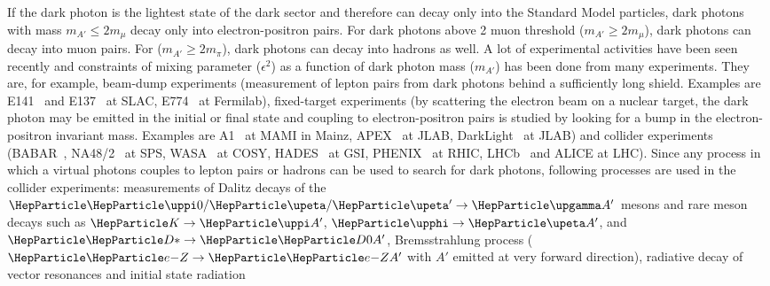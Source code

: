 \documentclass[../report.tex]{subfiles}
\begin{document}


If the dark photon is the lightest state of the dark sector 
and therefore can decay only into the Standard Model particles, dark photons with mass $m_{A'} \le 2m_{\mu}$ decay only into electron-positron pairs. 
For dark photons above 2 muon threshold ($m_{A'} \ge 2m_{\mu}$), 
dark photons can decay into muon pairs. For ($m_{A'} \ge 2m_{\pi}$), 
dark photons can decay into hadrons as well. 
A lot of experimental activities have been seen recently 
and constraints of mixing parameter ($\epsilon^2$) as a function 
of dark photon mass ($m_{A'}$) has been done from many experiments. 
They are, for example, 
beam-dump experiments (measurement of lepton pairs from dark photons 
behind a sufficiently long shield. 
Examples are E141~\cite{Riordan:1987aw} and E137~\cite{Bjorken:1988as}
at SLAC, E774~\cite{Bross:1989mp} at Fermilab), 
fixed-target experiments (by scattering the electron beam on a nuclear target, 
the dark photon may be emitted in the initial or final state and coupling to 
electron-positron pairs is studied by looking for a bump in the 
electron-positron invariant mass. Examples are A1~\cite{Merkel:2014avp} 
at MAMI in Mainz, APEX~\cite{Abrahamyan:2011gv} at JLAB, 
DarkLight~\cite{Balewski:2013oza} at JLAB)
and collider experiments (BABAR~\cite{Lees:2014xha}, 
NA48/2~\cite{Batley:2015lha} at SPS, WASA~\cite{Moskal:2014dsa} at COSY, 
HADES~\cite{Agakishiev:2013fwl} at GSI, 
PHENIX~\cite{Adare:2014mgk} at RHIC, LHCb~\cite{Aaij:2017rft} and ALICE at LHC).
Since any process in which a virtual photons couples to lepton pairs or hadrons 
can be used to search for dark photons, 
following processes are used in the collider experiments: measurements of Dalitz decays of the $\PGpz/\PGh/\PGh' \rightarrow \PGg A'$ mesons and rare meson decays such as $\PK\rightarrow \PGp A'$, $\PGf \rightarrow \PGh A'$, 
and $\PDst \rightarrow \PDz A'$,
Bremsstrahlung process 
($\Pem Z \rightarrow \Pem ZA'$ with $A'$ emitted at very forward direction),  
radiative decay of vector resonances and initial state radiation 
\end{document}
